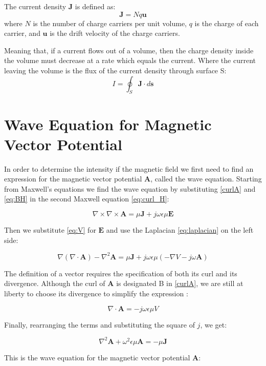 The current density \(\mathbf{J}\) is defined as:
\begin{equation}
\mathbf{J} = N q \mathbf{u}
\end{equation}
where \(N\) is the number of charge carriers per unit volume, \(q\) is the charge of each carrier, and \(\mathbf{u}\) is the drift velocity of the charge carriers.

Meaning that, if a current flows out of a volume, then the charge density inside the volume must decrease at a rate which equals the current.
Where the current leaving the volume is the flux of the current density through surface S:
\begin{equation}
I = \oint_S \mathbf{J} \cdot d\mathbf{s}
\label{eq:defI}
\end{equation} 

\section{Wave Equation for Magnetic Vector Potential }
In order to determine the intensity if the magnetic field we first need to find an expression for the magnetic vector potential \(\mathbf{A}\), called the wave equation.
Starting from Maxwell's equations we find the wave equation by substituting \ref{curlA} and \ref{eq:BH} in the second Maxwell equation \ref{eq:curl_H}:

\[
\nabla \times \nabla \times \mathbf{A} = \mu \mathbf{J} + j\omega\epsilon \mu \mathbf{E}
\]

Then we substitute \ref{eq:V} for $\mathbf{E}$ and use the Laplacian \ref{eq:laplacian} on the left side:

\[
\nabla (\nabla \cdot \mathbf{A}) - \nabla^2 \mathbf{A} = \mu \mathbf{J} + j\omega \epsilon \mu \left(-\nabla V - j \omega \mathbf{A}\right)
\]

The definition of a vector requires the specification of both its curl and its
divergence. Although the curl of $\mathbf{A}$ is designated B in \ref{curlA}, we are still at liberty to choose its divergence to simplify the expression \cite{book-magnetism}:

\[
\nabla \cdot \mathbf{A} = -  
 j \omega \epsilon \mu V
\]

Finally, rearranging the terms and substituting the square of $j$, we get:

\[
\nabla^2 \mathbf{A} + \omega^2 \epsilon \mu \mathbf{A} = -\mu \mathbf{J}
\]

This is the wave equation for the magnetic vector potential \(\mathbf{A}\):


